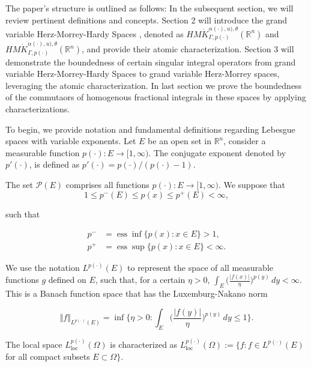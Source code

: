 \documentclass[oneside,reqno]{amsart}
\numberwithin{equation}{section}
\theoremstyle{definition}
\begin{document}
The paper's structure is outlined as follows: In the subsequent section, we will review pertinent definitions and concepts. Section 2 will introduce the  grand variable Herz-Morrey-Hardy Spaces , denoted as  $H M\dot{K} ^{\alpha(\cdot),u),\theta}_{ \Gamma, p(\cdot)}(\mathbb{R}^n)$ and  $H M\dot{K} ^{\alpha(\cdot),u),\theta}_{ \Gamma, p(\cdot)}(\mathbb{R}^n)$, and provide their atomic characterization. Section 3 will demonstrate the boundedness of certain singular integral operators from grand variable Herz-Morrey-Hardy Spaces  to grand variable Herz-Morrey spaces, leveraging the atomic characterization. In last section we prove the boundedness of the commutaors of homogenous fractional integrals in these spaces by applying characterizations. 



To begin, we provide notation and fundamental definitions regarding Lebesgue spaces with variable exponents.
\medskip
Let $E$ be an open set in  $\mathbb{R}^{n}$, consider  a measurable function $p(\cdot):E\rightarrow[1,\infty)$. The conjugate exponent denoted by $p'(\cdot)$, is  defined as $p'(\cdot)=p(\cdot)/(p(\cdot)-1).$

The set $\mathcal{P}(E)$ comprises all functions $p(\cdot):E\rightarrow[1,\infty) $. We suppose that
	\begin{equation}\label{eq1}
		1\leq p^-(E)\leq p(x) \leq p^+(E)<\infty,
	\end{equation}
 
 such that

\begin{align*}
p^{-}&=\operatorname{ess} \inf\bigl\{ p(x):x\in E\bigr\} >1, \\ p^{+}&=\operatorname{ess} \sup\bigl\{ p(x):x\in E\bigr\} < \infty.
\end{align*}

\medskip


We use the notation $L^{p(\cdot)}(E)$ to represent the space of all measurable functions $g$ defined on $E$, such that, for a certain $\eta>0$, $\int_{E} \biggl(\frac{ \vert f(x) \vert }{\eta} \biggr)^{p(y)}\,dy < \infty.$
This is a Banach function space that has the Luxemburg-Nakano norm 

$$\Vert f \Vert _{L^{p(\cdot)}(E)}=\inf \biggl\{ \eta>0: \int_{E} \biggl(\frac{ \vert f(y) \vert }{\eta} \biggr)^{p(y)}\,dy \leq1 \biggr\}.$$

\medskip


The local space $L_{\mathrm{loc}}^{p(\cdot)}(\varOmega)$ is characterized as  $L_{\mathrm{loc}}^{p(\cdot)}(\varOmega):=\{f: f\in L^{p(\cdot)}(E)$ for all compact subsets ${E\subset\varOmega\}}$.
\end{document}
